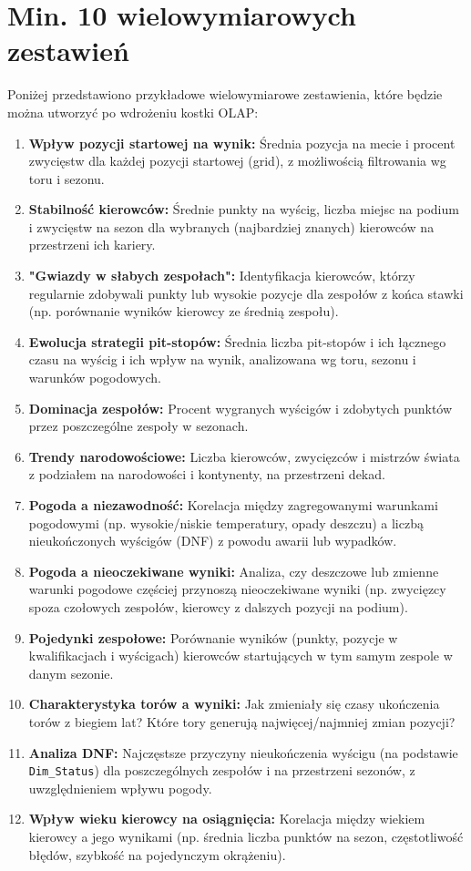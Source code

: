 \documentclass[a4paper,12pt]{article}
\begin{document}
\section{Min. 10 wielowymiarowych zestawień}
\label{sec:zestawienia}
Poniżej przedstawiono przykładowe wielowymiarowe zestawienia, które będzie można utworzyć po wdrożeniu kostki OLAP:
\begin{enumerate}[label=\arabic*., wide, labelindent=0pt]
  \item \textbf{Wpływ pozycji startowej na wynik:} Średnia pozycja na mecie i procent zwycięstw dla każdej pozycji startowej (grid), z możliwością filtrowania wg toru i sezonu.
  \item \textbf{Stabilność kierowców:} Średnie punkty na wyścig, liczba miejsc na podium i zwycięstw na sezon dla wybranych (najbardziej znanych) kierowców na przestrzeni ich kariery.
  \item \textbf{"Gwiazdy w słabych zespołach":} Identyfikacja kierowców, którzy regularnie zdobywali punkty lub wysokie pozycje dla zespołów z końca stawki (np. porównanie wyników kierowcy ze średnią zespołu).
  \item \textbf{Ewolucja strategii pit-stopów:} Średnia liczba pit-stopów i ich łącznego czasu na wyścig i ich wpływ na wynik, analizowana wg toru, sezonu i warunków pogodowych.
  \item \textbf{Dominacja zespołów:} Procent wygranych wyścigów i zdobytych punktów przez poszczególne zespoły w sezonach.
  \item \textbf{Trendy narodowościowe:} Liczba kierowców, zwycięzców i mistrzów świata z podziałem na narodowości i kontynenty, na przestrzeni dekad.
  \item \textbf{Pogoda a niezawodność:} Korelacja między zagregowanymi warunkami pogodowymi (np. wysokie/niskie temperatury, opady deszczu) a liczbą nieukończonych wyścigów (DNF) z powodu awarii lub wypadków.
  \item \textbf{Pogoda a nieoczekiwane wyniki:} Analiza, czy deszczowe lub zmienne warunki pogodowe częściej przynoszą nieoczekiwane wyniki (np. zwycięzcy spoza czołowych zespołów, kierowcy z dalszych pozycji na podium).
  \item \textbf{Pojedynki zespołowe:} Porównanie wyników (punkty, pozycje w kwalifikacjach i wyścigach) kierowców startujących w tym samym zespole w danym sezonie.
  \item \textbf{Charakterystyka torów a wyniki:} Jak zmieniały się czasy ukończenia torów z biegiem lat? Które tory generują najwięcej/najmniej zmian pozycji?
  \item \textbf{Analiza DNF:} Najczęstsze przyczyny nieukończenia wyścigu (na podstawie \texttt{Dim\_Status}) dla poszczególnych zespołów i na przestrzeni sezonów, z uwzględnieniem wpływu pogody.
  \item \textbf{Wpływ wieku kierowcy na osiągnięcia:} Korelacja między wiekiem kierowcy a jego wynikami (np. średnia liczba punktów na sezon, częstotliwość błędów, szybkość na pojedynczym okrążeniu).
\end{enumerate}
\end{document}
